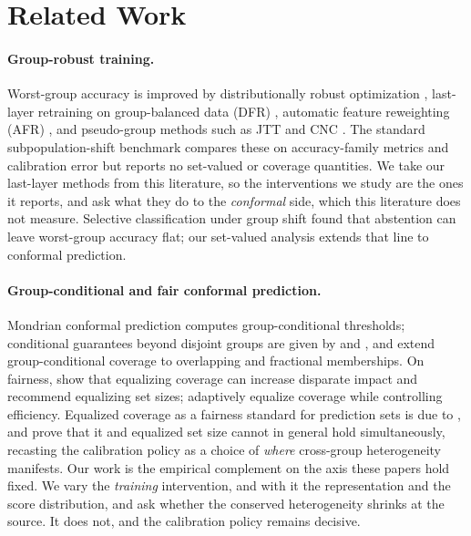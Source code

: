\documentclass[pdflatex,sn-basic]{sn-jnl}%
\theoremstyle{thmstyleone}%
\begin{document}
\section{Related Work}
\label{sec:related}

\paragraph{Group-robust training.} Worst-group accuracy is improved by
distributionally robust optimization \citep{sagawa2020}, last-layer retraining on
group-balanced data (DFR) \citep{kirichenko2023}, automatic feature reweighting
(AFR) \citep{qiu2023}, and pseudo-group methods such as JTT \citep{liu2021jtt} and
CNC \citep{zhang2022cnc}. The standard subpopulation-shift benchmark
\citep{yang2023change} compares these on accuracy-family metrics and calibration
error but reports no set-valued or coverage quantities. We take our last-layer methods from this literature, so the interventions we study are the ones
it reports, and ask what they do to the \emph{conformal} side, which this literature does not
measure. Selective classification under group
shift \citep{jones2021} found that abstention can leave worst-group accuracy flat; our set-valued
analysis extends that line to conformal prediction.

\paragraph{Group-conditional and fair conformal prediction.} Mondrian conformal prediction \citep{vovk2003mondrian,vovk2005} computes
group-conditional thresholds; conditional
guarantees beyond disjoint groups are given by \citet{gibbs2023} and
\citet{jung2023}, and \citet{deng2025kandinsky} extend group-conditional coverage
to overlapping and fractional memberships. On fairness, \citet{cresswell2024} show
that equalizing coverage can increase disparate impact and recommend equalizing
set sizes; \citet{afcp2024} adaptively equalize coverage while controlling
efficiency. Equalized coverage as a fairness standard for prediction sets is due to
\citet{romano2020equalized}, and \citet{burden2026} prove that it and equalized set
size cannot in general hold simultaneously, recasting the calibration policy as a
choice of \emph{where} cross-group heterogeneity manifests. Our work is the
empirical complement on the axis these papers hold fixed. We vary the
\emph{training} intervention, and with it the representation and the score distribution, and ask
whether the conserved heterogeneity shrinks at the source. It does not, and the
calibration policy remains decisive.
\end{document}

